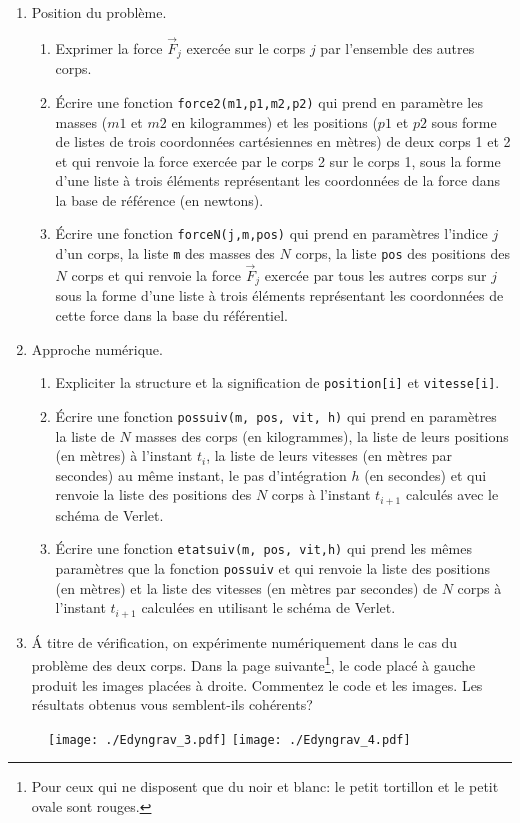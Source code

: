 \begin{enumerate}
  \item Position du problème.
\begin{enumerate}
  \item Exprimer la force $\overrightarrow{F}_j$ exercée sur le corps $j$ par l'ensemble des autres corps.
  \item \'Ecrire une fonction \texttt{force2(m1,p1,m2,p2)} qui prend en paramètre les masses ($m1$ et $m2$ en kilogrammes) et les positions ($p1$ et $p2$ sous forme de listes de trois coordonnées cartésiennes en mètres) de deux corps 1 et 2 et qui renvoie la force exercée par le corps 2 sur le corps 1, sous la forme d'une liste à trois éléments représentant les coordonnées de la force dans la base de référence (en newtons).
  \item \'Ecrire une fonction \texttt{forceN(j,m,pos)} qui prend en paramètres l'indice $j$ d'un corps, la liste \texttt{m} des masses des $N$ corps, la liste \texttt{pos} des positions des $N$ corps et qui renvoie la force $\overrightarrow{F}_j$ exercée par tous les autres corps sur $j$ sous la forme d'une liste à trois éléments représentant les coordonnées de cette force dans la base du référentiel.
\end{enumerate}

\item Approche numérique.
\begin{enumerate}
  \item Expliciter la structure et la signification de \texttt{position[i]} et \texttt{vitesse[i]}.
  \item \'Ecrire une fonction \texttt{pos\textunderscore suiv(m, pos, vit, h)} qui prend en paramètres la liste de $N$ masses des corps (en kilogrammes), la liste de leurs positions (en mètres) à l'instant $t_i$, la liste de leurs vitesses (en mètres par secondes) au même instant, le pas d'intégration $h$ (en secondes) et qui renvoie la liste des positions des $N$ corps à l'instant $t_{i+1}$ calculés avec le schéma de Verlet.
  \item \'Ecrire une fonction \texttt{etat\textunderscore suiv(m, pos, vit,h)} qui prend les mêmes paramètres que la fonction \texttt{pos\textunderscore suiv} et qui renvoie la liste des positions (en mètres) et la liste des vitesses (en mètres par secondes) de $N$ corps à l'instant $t_{i+1}$ calculées en utilisant le schéma de Verlet. 
\end{enumerate}
  \item \'A titre de vérification, on expérimente numériquement dans le cas du problème des deux corps. Dans la page suivante\footnote{Pour ceux qui ne disposent que du noir et blanc: le petit tortillon et le petit ovale sont rouges.}, le code placé à gauche produit les images placées à droite. Commentez le code et les images. Les résultats obtenus vous semblent-ils cohérents?
\end{enumerate}
\newpage

\begin{figure}[h]
  \centering
  \texttt{[image: ./Edyngrav\_3.pdf]}
  \texttt{[image: ./Edyngrav\_4.pdf]}
\end{figure}




